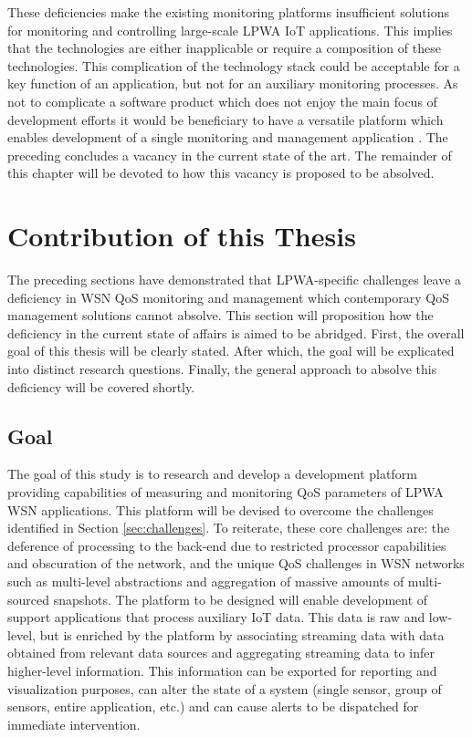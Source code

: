 These deficiencies make the existing monitoring platforms insufficient solutions for monitoring and controlling large-scale LPWA IoT applications. This implies that the technologies are either inapplicable or require a composition of these technologies. This complication of the technology stack could be acceptable for a key function of an application, but not for an auxiliary monitoring processes. As not to complicate a software product which does not enjoy the main focus of development efforts it would be beneficiary to have a versatile platform which enables development of a single monitoring and management application \cite{qos_multi_layer_strategies}. The preceding concludes a vacancy in the current state of the art. The remainder of this chapter will be devoted to how this vacancy is proposed to be absolved.

\section{Contribution of this Thesis}
The preceding sections have demonstrated that LPWA-specific challenges leave a deficiency in WSN QoS monitoring and management which contemporary QoS management solutions cannot absolve. This section will proposition how the deficiency in the current state of affairs is aimed to be abridged. First, the overall goal of this thesis will be clearly stated. After which, the goal will be explicated into distinct research questions. Finally, the general approach to absolve this deficiency will be covered shortly.
\subsection{Goal}
\label{sec:goal}
The goal of this study is to research and develop a development platform providing capabilities of measuring and monitoring QoS parameters of LPWA WSN applications. This platform will be devised to overcome the challenges identified in Section \ref{sec:challenges}. To reiterate, these core challenges are: the deference of processing to the back-end due to restricted processor capabilities and obscuration of the network, and the unique QoS challenges in WSN networks such as multi-level abstractions and aggregation of massive amounts of multi-sourced snapshots. The platform to be designed will enable development of support applications that process auxiliary IoT data. This data is raw and low-level, but is enriched by the platform by associating streaming data with data obtained from relevant data sources and aggregating streaming data to infer higher-level information. This information can be exported for reporting and visualization purposes, can alter the state of a system (single sensor, group of sensors, entire application, etc.) and can cause alerts to be dispatched for immediate intervention.

